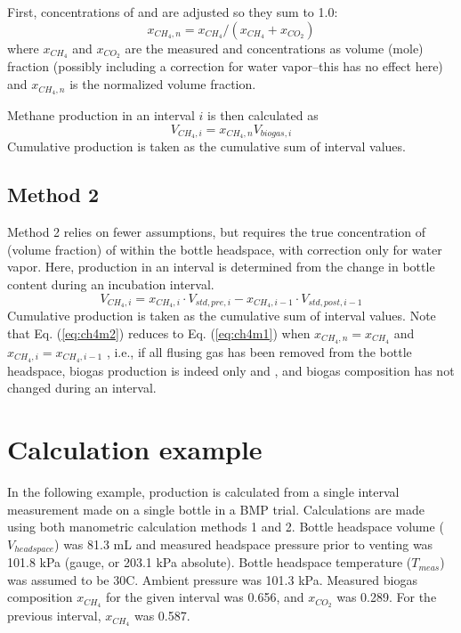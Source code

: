 \documentclass[]{article}
\begin{document}
First, concentrations of  and  are adjusted so they sum to 1.0:
\begin{equation}
  x_{CH_4, n} = x_{CH_4}/(x_{CH_4} + x_{CO_2})
\end{equation}
where $x_{CH_4}$ and $x_{CO_2}$ are the measured  and  concentrations as volume (mole) fraction (possibly including a correction for water vapor--this has no effect here) and $x_{CH_4, n}$ is the normalized  volume fraction.

Methane production in an interval $i$ is then calculated as
\begin{equation}
  \label{eq:ch4m1}
  V_{CH_4, i} = x_{CH_4, n} V_{biogas, i}
\end{equation}
Cumulative production is taken as the cumulative sum of interval values. 

\subsection{Method 2}
Method 2 relies on fewer assumptions, but requires the true concentration of  (volume fraction) of  within the bottle headspace, with correction only for water vapor.
Here,  production in an interval is determined from the change in bottle  content during an incubation interval.
\begin{equation}
  \label{eq:ch4m2}
  V_{CH_4, i} = x_{CH_4, i} \cdot V_{std, pre, i} - x_{CH_4, i - 1} \cdot V_{std, post, i - 1}
\end{equation}
Cumulative production is taken as the cumulative sum of interval values. 
Note that Eq. (\ref{eq:ch4m2}) reduces to Eq. (\ref{eq:ch4m1}) when $x_{CH_4, n} = x_{CH_4}$ and $x_{CH_4, i} = x_{CH_4, i - 1}$ , i.e., if all flusing gas has been removed from the bottle headspace, biogas production is indeed only  and , and biogas composition has not changed during an interval.

\section{Calculation example}
In the following example,  production is calculated from a single interval measurement made on a single bottle in a BMP trial. 
Calculations are made using both manometric calculation methods 1 and 2. 
Bottle headspace volume ($V_{headspace}$) was 81.3 mL and measured headspace pressure prior to venting was 101.8 kPa (gauge, or 203.1 kPa absolute). 
Bottle headspace temperature ($T_{meas}$) was assumed to be 30\degree C.
Ambient pressure was 101.3 kPa.
Measured biogas composition $x_{CH_4}$ for the given interval was 0.656, and $x_{CO_2}$ was 0.289.
For the previous interval, $x_{CH_4}$ was 0.587.
\end{document}
